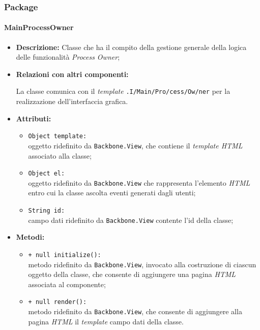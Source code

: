 \subsubsection{Package \logicAdmin{}}

\paragraph{MainProcessOwner}
\label{mainProcessOwner}
\begin{flushleft}
\begin{itemize}
\item \textbf{Descrizione:} Classe che ha il compito della gestione generale della logica delle funzionalità \textit{Process Owner};
\item \textbf{Relazioni con altri componenti:}
\begin{sloppypar}
La classe comunica con il \textit{template} \texttt{\viewAdmin{}.I\fshyp{}Main\fshyp{}Pro\fshyp{}cess\fshyp{}Ow\fshyp{}ner} per la realizzazione dell'interfaccia grafica.
\end{sloppypar}
\item \textbf{Attributi:}
\begin{sloppypar}
\begin{itemize}
\item \texttt{Object template:}\\ oggetto ridefinito da \texttt{Backbone.View}, che contiene il \textit{template HTML} associato alla classe;
\item \texttt{Object el:}\\ oggetto ridefinito da \texttt{Backbone.View} che rappresenta l'elemento \textit{HTML} entro cui la classe ascolta eventi generati dagli utenti;
\item \texttt{String id:}\\ campo dati ridefinito da \texttt{Backbone.View} contente l'id della classe;
\end{itemize}
\end{sloppypar}
\item \textbf{Metodi:}
\begin{sloppypar}
\begin{itemize}
\item \texttt{+ null initialize():}\\ metodo ridefinito da \texttt{Backbone.View}, invocato alla costruzione di ciascun oggetto della classe, che consente di aggiungere una pagina \textit{HTML} associata al componente;
\item \texttt{+ null render():}\\ metodo ridefinito da \texttt{Backbone.View}, che consente di aggiungere alla pagina \textit{HTML} il \textit{template} campo dati della classe.
\end{itemize}
\end{sloppypar}
\end{itemize}
\end{flushleft}


